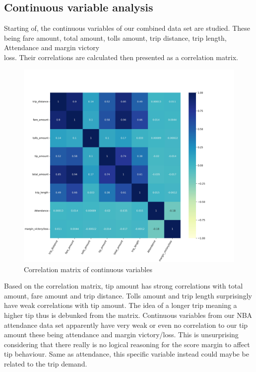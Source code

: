 \documentclass[11pt]{article}
\begin{document}
\subsection{Continuous variable analysis}
Starting of, the continuous variables of our combined data set are studied. These being fare amount, total amount, tolls amount, trip distance, trip length, Attendance and margin victory\\loss. Their correlations are calculated then presented as a correlation matrix.
\begin{figure}[h]
    \includegraphics[height = 13 cm, width = 18 cm]{plots/correlation_matrix.jpeg}
    \centering
    \caption{Correlation matrix of continuous variables} %
\end{figure}

Based on the correlation matrix, tip amount has strong correlations with total amount, fare amount and trip distance. Tolls amount and trip length surprisingly have weak correlations with tip amount. The idea of a longer trip meaning a higher tip thus is debunked from the matrix. Continuous variables from our NBA attendance data set apparently have very weak or even no correlation to our tip amount these being attendance and margin victory/loss. This is unsurprising considering that there really is no logical reasoning for the score margin to affect tip behaviour. Same as attendance, this specific variable instead could maybe be related to the trip demand.
\end{document}

